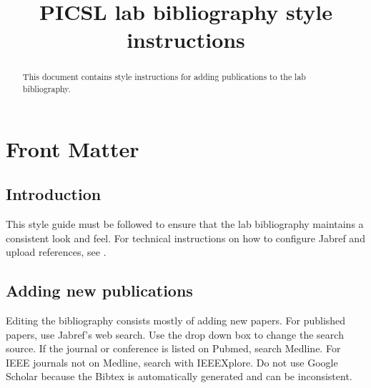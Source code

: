 \documentclass{InsightArticle}
\title{PICSL lab bibliography style instructions}
\begin{document}
%
% 


\ifpdf
\else
\fi


\maketitle


\ifhtml
\chapter*{Front Matter\label{front}}
\fi



\begin{abstract}
\noindent This document contains style instructions for adding publications to the lab bibliography.
\end{abstract}

\tableofcontents
\newpage

\section{Introduction}

This style guide must be followed to ensure that the lab bibliography maintains a consistent look and feel. For technical instructions on how to configure Jabref and upload references, see .


\section{Adding new publications}

Editing the bibliography consists mostly of adding new papers. For published papers, use Jabref's web search. Use the drop down box to change the search source. If the journal or conference is listed on Pubmed, search Medline. For IEEE journals not on Medline, search with IEEEXplore. Do not use Google Scholar because the Bibtex is automatically generated and can be inconsistent.
\end{document}
